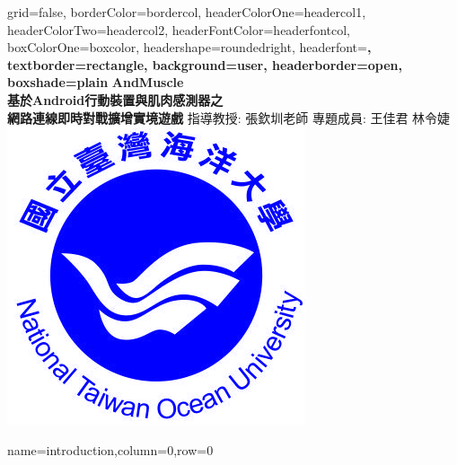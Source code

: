 \documentclass[a0paper,portrait]{baposter}
\begin{document}
\begin{poster}{
grid=false,
borderColor=bordercol, %
headerColorOne=headercol1, %
headerColorTwo=headercol2, %
headerFontColor=headerfontcol, %
boxColorOne=boxcolor, %
headershape=roundedright, %
headerfont=\Large\sf\bf, %
textborder=rectangle,
background=user,
headerborder=open, %
boxshade=plain
}
{}
%
%
{\sf\bf AndMuscle \\ \smaller \smaller 基於Android行動裝置與肌肉感測器之 \\ 網路連線即時對戰擴增實境遊戲} %
{\vspace{1em} 指導教授: 張欽圳\space 老師
 \space \space 專題成員: 王佳君 \space 林令婕 %
}
{\includegraphics[scale=1.0]{ntoulogo}} %


{name=introduction,column=0,row=0}{

}
\end{poster}
\end{document}
